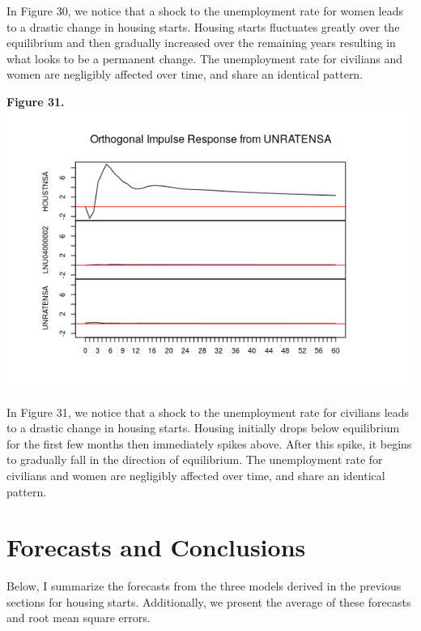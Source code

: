 \documentclass[11pt]{article}
\begin{document}
In Figure 30, we notice that a shock to the unemployment rate for women leads to a drastic change in housing starts. Housing starts fluctuates greatly over the equilibrium and then gradually increased over the remaining years resulting in what looks to be a permanent change. The unemployment rate for civilians and women are negligibly affected over time, and share an identical pattern.
\begin{center}
\textbf{Figure 31.}
\\
\includegraphics[scale=1]{urShock}
\end{center}
In Figure 31, we notice that a shock to the unemployment rate for civilians leads to a drastic change in housing starts. Housing initially drops below equilibrium for the first few months then immediately spikes above. After this spike, it begins to gradually fall in the direction of equilibrium. The unemployment rate for civilians and women are negligibly affected over time, and share an identical pattern.
\section{Forecasts and Conclusions}
Below, I summarize the forecasts from the three models derived in the previous sections for housing starts. Additionally, we present the average of these forecasts and root mean square errors.
\end{document}
